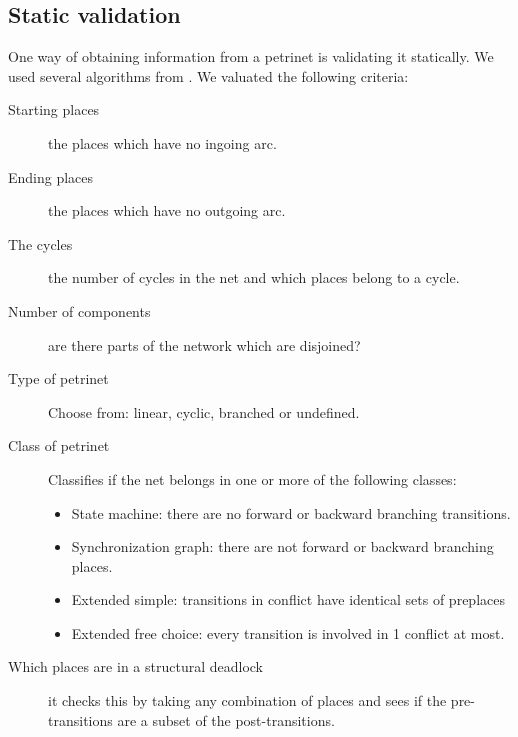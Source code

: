 \documentclass[12pt,a4paper,draft]{article}
\begin{document}
    
    
\subsection{Static validation}\label{sec:static_validation}
    One way of obtaining information from a petrinet is validating it statically. We used several algorithms from \cite{Heiner2008}. We valuated the following criteria:
    \begin{description}
        
    \item [Starting places] the places which have no ingoing arc.
    
    \item [Ending places]\label{item:ending_places} the places which have no outgoing arc.
    
    \item [The cycles] the number of cycles in the net and which places belong to a cycle.
    
    \item [Number of components] are there parts of the network which are disjoined?

    \item [Type of petrinet] Choose from: linear, cyclic, branched or undefined.

    \item [Class of petrinet] Classifies if the net belongs in one or more of the following classes:
    \begin{itemize}
        \item State machine: there are no forward or backward branching transitions.
        \item Synchronization graph: there are not forward or backward branching places.
        \item Extended simple: transitions in conflict have identical sets of preplaces
        \item Extended free choice: every transition is involved in 1 conflict at most.
    \end{itemize}
    
    \item [Which places are in a structural deadlock] it checks this by taking any combination of places and sees if the pre-transitions are a subset of the post-transitions.
    

\end{description}
\end{document}
